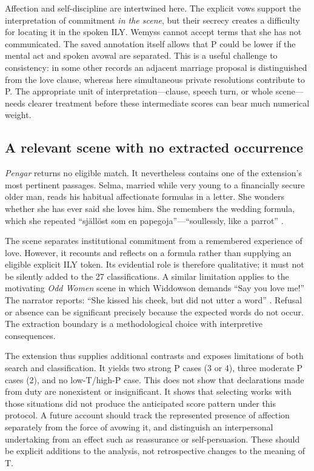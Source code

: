 \documentclass[11pt,a4paper]{article}
\begin{document}
Affection and self-discipline are intertwined here. The explicit vows support the interpretation of commitment \emph{in the scene}, but their secrecy creates a difficulty for locating it in the spoken ILY. Wemyss cannot accept terms that she has not communicated. The saved annotation itself allows that P could be lower if the mental act and spoken avowal are separated. This is a useful challenge to consistency: in some other records an adjacent marriage proposal is distinguished from the love clause, whereas here simultaneous private resolutions contribute to P. The appropriate unit of interpretation---clause, speech turn, or whole scene---needs clearer treatment before these intermediate scores can bear much numerical weight.

\subsection{A relevant scene with no extracted occurrence}

\emph{Pengar} returns no eligible match. It nevertheless contains one of the extension's most pertinent passages. Selma, married while very young to a financially secure older man, reads his habitual affectionate formulas in a letter. She wonders whether she has ever said she loves him. She remembers the wedding formula, which she repeated “själlöst som en papegoja”---“soullessly, like a parrot” \citep[chap.~VI]{benedictssonPengar}.

The scene separates institutional commitment from a remembered experience of love. However, it recounts and reflects on a formula rather than supplying an eligible explicit ILY token. Its evidential role is therefore qualitative; it must not be silently added to the 27 classifications. A similar limitation applies to the motivating \emph{Odd Women} scene in which Widdowson demands “Say you love me!” The narrator reports: “She kissed his cheek, but did not utter a word” \citep[chap.~XVI]{gissingOddWomen}. Refusal or absence can be significant precisely because the expected words do not occur. The extraction boundary is a methodological choice with interpretive consequences.

The extension thus supplies additional contrasts and exposes limitations of both search and classification. It yields two strong P cases (3 or 4), three moderate P cases (2), and no low-T/high-P case. This does not show that declarations made from duty are nonexistent or insignificant. It shows that selecting works with those situations did not produce the anticipated score pattern under this protocol. A future account should track the represented presence of affection separately from the force of avowing it, and distinguish an interpersonal undertaking from an effect such as reassurance or self-persuasion. These should be explicit additions to the analysis, not retrospective changes to the meaning of T.
\end{document}
